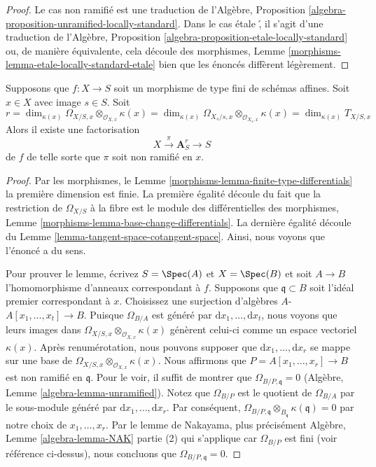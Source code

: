 \begin{proof}
Le cas non ramifié est une traduction de l'Algèbre,
Proposition
\ref{algebra-proposition-unramified-locally-standard}. Dans le cas
étale \', il s'agit d'une traduction de l'Algèbre, Proposition
\ref{algebra-proposition-etale-locally-standard} ou, de manière
équivalente, cela découle des morphismes, Lemme
\ref{morphisms-lemma-etale-locally-standard-etale} bien que les énoncés diffèrent légèrement.
\end{proof}

\begin{lemma}
\label{lemma-unramfied-over-affine}
Supposons que $f : X \to S$ soit un morphisme de type fini
de schémas affines. Soit $x \in X$ avec image $s \in S$. Soit
$$
r =
\dim_{\kappa(x)} \Omega_{X/S, x} \otimes_{\mathcal{O}_{X, x}} \kappa(x) =
\dim_{\kappa(x)} \Omega_{X_s/s, x} \otimes_{\mathcal{O}_{X_s, x}} \kappa(x) =
\dim_{\kappa(x)} T_{X/S, x}
$$
Alors il existe une factorisation
$$
X \xrightarrow{\pi} \mathbf{A}^r_S \to S
$$
de $f$ de telle sorte que $\pi$ soit non ramifié en $x$.
\end{lemma}

\begin{proof}
Par les morphismes, le Lemme
\ref{morphisms-lemma-finite-type-differentials} la
première dimension est finie. La première égalité découle
du fait que la restriction de $\Omega_{X/S}$ à la fibre
est le module des différentielles des morphismes, Lemme
\ref{morphisms-lemma-base-change-differentials}. La
dernière égalité découle du Lemme
\ref{lemma-tangent-space-cotangent-space}. Ainsi, nous voyons que l'énoncé a du sens.

\medskip\noindent
Pour prouver le lemme, écrivez $S = \Spec(A)$ et $X = \Spec(B)$ et
soit $A \to B$ l'homomorphisme d'anneaux correspondant à $f$.
Supposons que $\mathfrak q \subset B$ soit l'idéal premier
correspondant à $x$. Choisissez une surjection d'algèbres
$A$-$A[x_1, \ldots, x_t] \to B$. Puisque $\Omega_{B/A}$ est généré
par $\text{d}x_1, \ldots, \text{d}x_t$, nous voyons que leurs images
dans $\Omega_{X/S, x} \otimes_{\mathcal{O}_{X, x}} \kappa(x)$
génèrent celui-ci comme un espace vectoriel $\kappa(x)$. Après
renumérotation, nous pouvons supposer que $\text{d}x_1, \ldots,
\text{d}x_r$ se mappe sur une base de $\Omega_{X/S, x}
\otimes_{\mathcal{O}_{X, x}} \kappa(x)$. Nous affirmons que $P = A[x_1,
\ldots, x_r] \to B$ est non ramifié en $\mathfrak q$. Pour le voir, il
suffit de montrer que $\Omega_{B/P, \mathfrak q} = 0$ (Algèbre, Lemme
\ref{algebra-lemma-unramified}). Notez que $\Omega_{B/P}$ est le
quotient de $\Omega_{B/A}$ par le sous-module généré par $\text{d}x_1,
\ldots, \text{d}x_r$. Par conséquent, $\Omega_{B/P, \mathfrak q}
\otimes_{B_\mathfrak q} \kappa(\mathfrak q) = 0$ par notre choix de $x_1,
\ldots, x_r$. Par le lemme de Nakayama, plus précisément Algèbre, Lemme
\ref{algebra-lemma-NAK} partie (2) qui s'applique car $\Omega_{B/P}$ est fini
(voir référence ci-dessus), nous concluons que $\Omega_{B/P, \mathfrak q} = 0$.
\end{proof}

